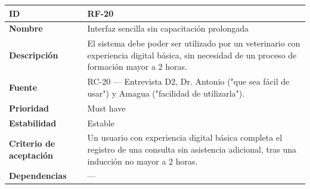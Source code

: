 \documentclass[
]{article}
\newcounter{none} %
\begin{document}
{\def\LTcaptype{none} %
\begin{longtable}[]{@{}
  >{\raggedright\arraybackslash}p{}
  >{\raggedright\arraybackslash}p{}@{}}
\toprule\noalign{}
\begin{minipage}[b]{\linewidth}\raggedright
\textbf{ID}
\end{minipage} & \begin{minipage}[b]{\linewidth}\raggedright
RF-20
\end{minipage} \\
\midrule\noalign{}
\endhead
\bottomrule\noalign{}
\endlastfoot
\textbf{Nombre} & \begin{minipage}[t]{\linewidth}\raggedright
Interfaz sencilla sin capacitación prolongada
\end{minipage} \\
\textbf{Descripción} & \begin{minipage}[t]{\linewidth}\raggedright
El sistema debe poder ser utilizado por un veterinario con experiencia
digital básica, sin necesidad de un proceso de formación mayor a 2
horas.
\end{minipage} \\
\textbf{Fuente} & \begin{minipage}[t]{\linewidth}\raggedright
RC-20 --- Entrevista D2, Dr. Antonio ("que sea fácil de usar") y Amagua
("facilidad de utilizarla").
\end{minipage} \\
\textbf{Prioridad} & \begin{minipage}[t]{\linewidth}\raggedright
Must have
\end{minipage} \\
\textbf{Estabilidad} & \begin{minipage}[t]{\linewidth}\raggedright
Estable
\end{minipage} \\
\textbf{Criterio de aceptación} &
\begin{minipage}[t]{\linewidth}\raggedright
Un usuario con experiencia digital básica completa el registro de una
consulta sin asistencia adicional, tras una inducción no mayor a 2
horas.
\end{minipage} \\
\textbf{Dependencias} & \begin{minipage}[t]{\linewidth}\raggedright
---
\end{minipage} \\
\end{longtable}
}
\end{document}
